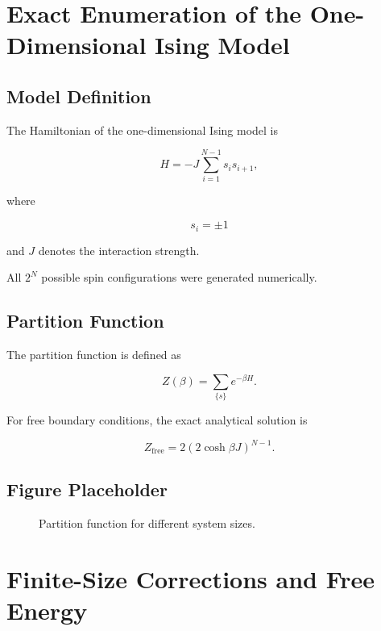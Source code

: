 \documentclass[a4paper]{article}
\begin{document}
\section{Exact Enumeration of the One-Dimensional Ising Model}

\subsection{Model Definition}

The Hamiltonian of the one-dimensional Ising model is

\begin{equation}
H = -J \sum_{i=1}^{N-1} s_i s_{i+1},
\end{equation}

where

\[
s_i=\pm1
\]

and \(J\) denotes the interaction strength.

All \(2^N\) possible spin configurations were generated numerically.

\subsection{Partition Function}

The partition function is defined as

\begin{equation}
Z(\beta)=\sum_{\{s\}} e^{-\beta H}.
\end{equation}

For free boundary conditions, the exact analytical solution is

\begin{equation}
Z_{\mathrm{free}}
=
2(2\cosh \beta J)^{N-1}.
\end{equation}

\subsection{Figure Placeholder}

\begin{figure}[H]
\centering
{}
\caption{Partition function for different system sizes.}
\label{fig:partition}
\end{figure}

\section{Finite-Size Corrections and Free Energy}
\end{document}
